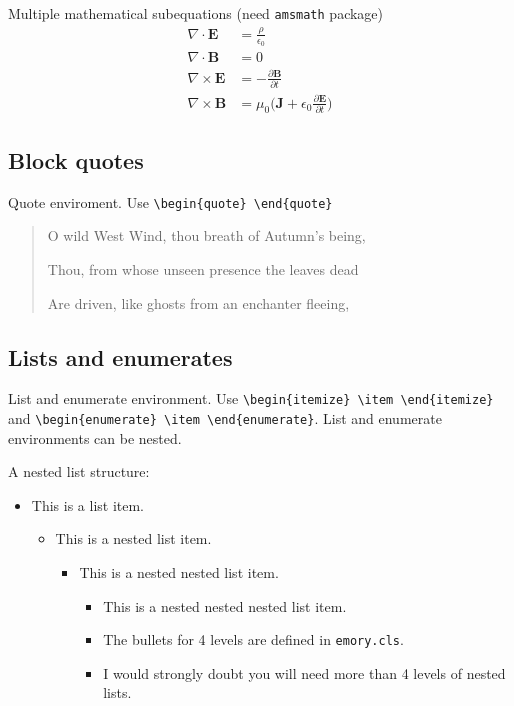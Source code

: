 \documentclass[final]{emory}
\begin{document}
Multiple mathematical subequations (need \Verb|amsmath| package)
\begin{subequations}\label{math:sub}
\begin{align}
  \nabla\cdot\pmb{E}&=\frac{\rho}{\epsilon_0} \label{math:sub1}\\
  \nabla\cdot\pmb{B}&=0 \label{math:sub2} \\
  \nabla\times\pmb{E}&=-\frac{\partial\pmb{B}}{\partial t} \label{math:sub3}\\
  \nabla\times\pmb{B}&=\mu_0\Big(\pmb{J}+\epsilon_0\frac{\partial\pmb{E}}{\partial t}\Big) \label{math:sub4}
\end{align}
\end{subequations}

\subsection{Block quotes}
Quote enviroment. Use \Verb|\begin{quote} \end{quote}|

\begin{quote}\label{poet}
O wild West Wind, thou breath of Autumn's being,

Thou, from whose unseen presence the leaves dead

Are driven, like ghosts from an enchanter fleeing,
\end{quote}

\subsection{Lists and enumerates}
List and enumerate environment. Use \Verb|\begin{itemize} \item \end{itemize}|
and \Verb|\begin{enumerate} \item \end{enumerate}|. List and enumerate 
environments
can be nested.

A nested list structure:
\begin{itemize}
  \item This is a list item.
  \begin{itemize}
    \item This is a nested list item.
    \begin{itemize}
      \item This is a nested nested list item.
      \begin{itemize}
        \item This is a nested nested nested list item. 
        \item The bullets for 4 levels are defined in \Verb|emory.cls|.
        \item I would strongly doubt you will need more than 4 levels of nested lists.
      \end{itemize}
    \end{itemize}
  \end{itemize}    
\end{itemize}
\end{document}
